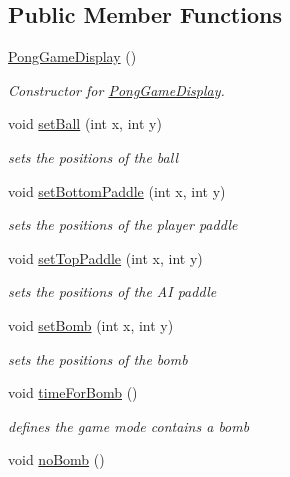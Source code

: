 \subsection*{Public Member Functions}
\begin{DoxyCompactItemize}
\item 
\hyperlink{classview_1_1_pong_game_display_a1d578a032b81c4025ba91e6366672e07}{Pong\+Game\+Display} ()
\begin{DoxyCompactList}\small\item\em Constructor for \hyperlink{classview_1_1_pong_game_display}{Pong\+Game\+Display}. \end{DoxyCompactList}\item 
void \hyperlink{classview_1_1_pong_game_display_ac6afa3842b0a26be46dd0b7d202d887d}{set\+Ball} (int x, int y)
\begin{DoxyCompactList}\small\item\em sets the positions of the ball \end{DoxyCompactList}\item 
void \hyperlink{classview_1_1_pong_game_display_aa2f0ba3a3f8bc84bd079302904a57133}{set\+Bottom\+Paddle} (int x, int y)
\begin{DoxyCompactList}\small\item\em sets the positions of the player paddle \end{DoxyCompactList}\item 
void \hyperlink{classview_1_1_pong_game_display_a175282d960f6beec7819bd373f09f170}{set\+Top\+Paddle} (int x, int y)
\begin{DoxyCompactList}\small\item\em sets the positions of the AI paddle \end{DoxyCompactList}\item 
void \hyperlink{classview_1_1_pong_game_display_adb358611d0a270aaf5954141ec8d35c0}{set\+Bomb} (int x, int y)
\begin{DoxyCompactList}\small\item\em sets the positions of the bomb \end{DoxyCompactList}\item 
void \hyperlink{classview_1_1_pong_game_display_a67b7b51feffc6573e92ac9c979ade0e2}{time\+For\+Bomb} ()
\begin{DoxyCompactList}\small\item\em defines the game mode contains a bomb \end{DoxyCompactList}\item 
void \hyperlink{classview_1_1_pong_game_display_a51b69bc0f6f840b4c736049115e0f449}{no\+Bomb} ()

\end{DoxyCompactItemize}
